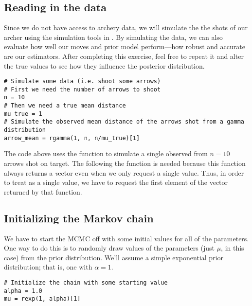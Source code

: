 \subsection{Reading in the data}
Since we do not have access to archery data, we will simulate the the shots of our archer using the simulation tools in \RevBayes.
By simulating the data, we can also evaluate how well our moves and prior model perform---\IE how robust and accurate are our estimators.
After completing this exercise, feel free to repeat it and alter the true values to see how they influence the posterior distribution.
{\tt \begin{snugshade*}
\begin{lstlisting}    
# Simulate some data (i.e. shoot some arrows)
# First we need the number of arrows to shoot
n = 10
# Then we need a true mean distance
mu_true = 1
# Simulate the observed mean distance of the arrows shot from a gamma distribution
arrow_mean = rgamma(1, n, n/mu_true)[1]
\end{lstlisting}
\end{snugshade*}}

The \Rev code above uses the  function to simulate a single observed  from $n=10$ arrows shot on target.
The \cl{[1]} following the  function is needed because this function always returns a {\emph vector} even when we only request a single value. Thus, in order to treat  as a single value, we have to request the first element of the vector returned by that function.


\subsection{Initializing the Markov chain}
We have to start the MCMC off with some initial values for all of the parameters.
One way to do this is to randomly draw values of the parameters (just $\mu$, in this case) from the prior distribution.
We'll assume a simple exponential prior distribution; that is, one with $\alpha = 1$.
{\tt \begin{snugshade*}
\begin{lstlisting}
# Initialize the chain with some starting value
alpha = 1.0
mu = rexp(1, alpha)[1]
\end{lstlisting}
\end{snugshade*}}



